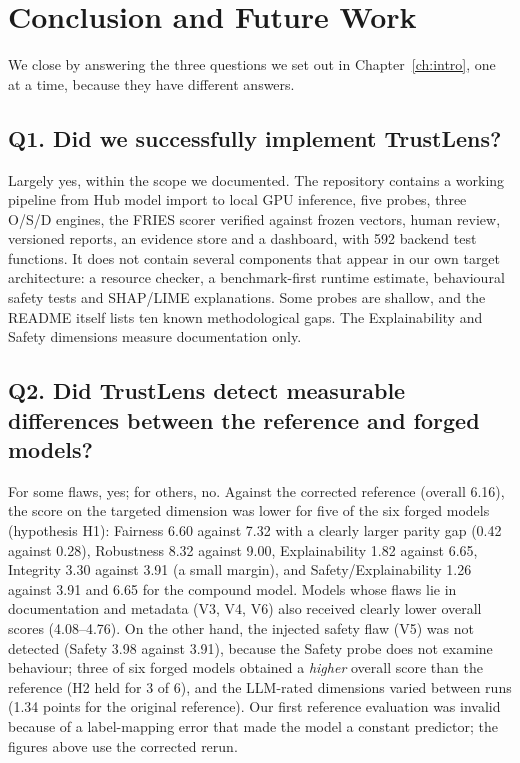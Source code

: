 \chapter{Conclusion and Future Work}\label{ch:conclusion}

We close by answering the three questions we set out in Chapter~\ref{ch:intro}, one at a time, because they have different answers.

\section{Q1. Did we successfully implement TrustLens?}
Largely yes, within the scope we documented. The repository contains a working pipeline from Hub model import to local GPU inference, five probes, three O/S/D engines, the FRIES scorer verified against frozen vectors, human review, versioned reports, an evidence store and a dashboard, with 592 backend test functions. It does not contain several components that appear in our own target architecture: a resource checker, a benchmark-first runtime estimate, behavioural safety tests and SHAP/LIME explanations. Some probes are shallow, and the README itself lists ten known methodological gaps. The Explainability and Safety dimensions measure documentation only.

\section{Q2. Did TrustLens detect measurable differences between the reference and forged models?}
For some flaws, yes; for others, no. Against the corrected reference (overall 6.16), the score on the targeted dimension was lower for five of the six forged models (hypothesis H1): Fairness 6.60 against 7.32 with a clearly larger parity gap (0.42 against 0.28), Robustness 8.32 against 9.00, Explainability 1.82 against 6.65, Integrity 3.30 against 3.91 (a small margin), and Safety/Explainability 1.26 against 3.91 and 6.65 for the compound model. Models whose flaws lie in documentation and metadata (V3, V4, V6) also received clearly lower overall scores (4.08--4.76). On the other hand, the injected safety flaw (V5) was not detected (Safety 3.98 against 3.91), because the Safety probe does not examine behaviour; three of six forged models obtained a \emph{higher} overall score than the reference (H2 held for 3 of 6), and the LLM-rated dimensions varied between runs (1.34 points for the original reference). Our first reference evaluation was invalid because of a label-mapping error that made the model a constant predictor; the figures above use the corrected rerun.

